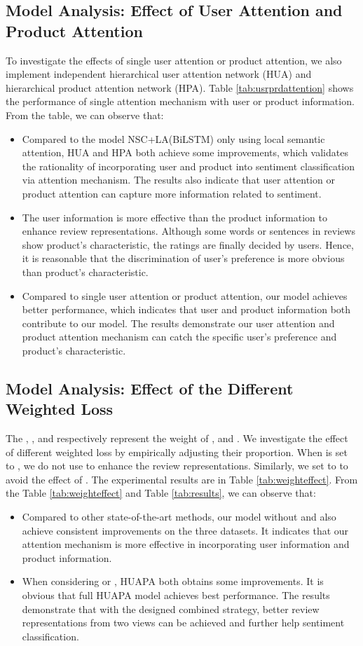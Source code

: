 \documentclass[letterpaper]{article} \usepackage{aaai18}  \usepackage{times}  \usepackage{helvet}  \usepackage{courier}  \usepackage{url}  \usepackage{graphicx}  \frenchspacing  \usepackage{amsmath}
\begin{document}
\subsection{Model Analysis: Effect of User Attention and Product Attention}
To investigate the effects of single user attention or product attention, we also implement independent hierarchical user attention network (HUA) and hierarchical product attention network (HPA). Table \ref{tab:usrprdattention} shows the performance of single attention mechanism with user or product information. From the table, we can observe that:
\begin{itemize}
\item Compared to the model NSC+LA(BiLSTM) only using local semantic attention, HUA and HPA both achieve some improvements, which validates the rationality of incorporating user and product into sentiment classification via attention mechanism. The results also indicate that user attention or product attention can capture more information related to sentiment.
\item The user information is more effective than the product information to enhance review representations. Although some words or sentences in reviews show product's characteristic, the ratings are finally decided by users. Hence, it is reasonable that the discrimination of user's preference is more obvious than product's characteristic.
\item Compared to single user attention or product attention, our model achieves better performance, which indicates that user and product information both contribute to our model. The results demonstrate our user attention and product attention mechanism can catch the specific user's preference and product's characteristic.
\end{itemize}

\subsection{Model Analysis: Effect of the Different Weighted Loss}
The , , and  respectively represent the weight of ,  and . We investigate the effect of different weighted loss by empirically adjusting their proportion.  When  is set to , we do not use  to enhance the review representations. Similarly, we set  to  to avoid the effect of . The experimental results are in Table \ref{tab:weighteffect}. From the Table \ref{tab:weighteffect} and Table \ref{tab:results}, we can observe that:

\begin{itemize}
\item Compared to other state-of-the-art methods, our model without  and  also achieve consistent improvements on the three datasets. It indicates that our attention mechanism is more effective in incorporating user information and product information.
\item When considering  or , HUAPA both obtains some improvements. It is obvious that full HUAPA model achieves best performance. The results demonstrate that with the designed combined strategy, better review representations from two views can be achieved and further help sentiment classification.
\end{itemize}
\end{document}
